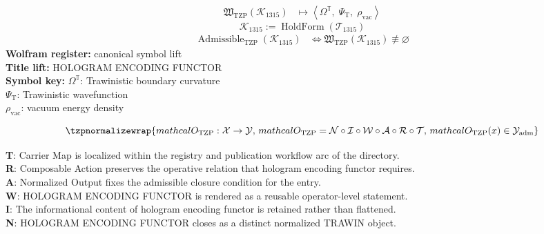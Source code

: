 \noindent
\begin{minipage}[t]{0.48\linewidth}
\begingroup
\small
\[
\begin{aligned}
\mathfrak{W}_{\mathrm{TZP}}\!\left(\mathcal{K}_{1315}\right)
&\longmapsto
\left\langle \Omega^{\mathbb{T}},\; \Psi_{\mathrm{T}},\; \rho_{\mathrm{vac}} \right\rangle
\end{aligned}
\]
\[
\mathcal{K}_{1315}
:=
\operatorname{HoldForm}\!\left(\mathcal{T}_{1315}\right)
\]
\[
\begin{aligned}
\operatorname{Admissible}_{\mathrm{TZP}}\!\left(\mathcal{K}_{1315}\right)
&\Longleftrightarrow
\mathfrak{W}_{\mathrm{TZP}}\!\left(\mathcal{K}_{1315}\right)\not\equiv\varnothing
\end{aligned}
\]
\textbf{Wolfram register:} canonical symbol lift\\
\textbf{Title lift:} HOLOGRAM ENCODING FUNCTOR\\
\textbf{Symbol key:} \(\Omega^{\mathbb{T}}\): Trawinistic boundary curvature\\ \(\Psi_{\mathrm{T}}\): Trawinistic wavefunction\\ \(\rho_{\mathrm{vac}}\): vacuum energy density
\par
\endgroup
\end{minipage}\hfill
\begin{minipage}[t]{0.48\linewidth}
\[
\tzpnormalizewrap{mathcal{O}_{\mathrm{TZP}} : \mathcal{X} \to \mathcal{Y},\,mathcal{O}_{\mathrm{TZP}} = \mathcal{N}\circ \mathcal{I}\circ \mathcal{W}\circ \mathcal{A}\circ \mathcal{R}\circ \mathcal{T},\,mathcal{O}_{\mathrm{TZP}}(x) \in \mathcal{Y}_{\mathrm{adm}}}
\]

\small
\textbf{T}: Carrier Map is localized within the registry and publication workflow arc of the directory.\\
\textbf{R}: Composable Action preserves the operative relation that hologram encoding functor requires.\\
\textbf{A}: Normalized Output fixes the admissible closure condition for the entry.\\
\textbf{W}: HOLOGRAM ENCODING FUNCTOR is rendered as a reusable operator-level statement.\\
\textbf{I}: The informational content of hologram encoding functor is retained rather than flattened.\\
\textbf{N}: HOLOGRAM ENCODING FUNCTOR closes as a distinct normalized TRAWIN object.
\normalsize
\end{minipage}

